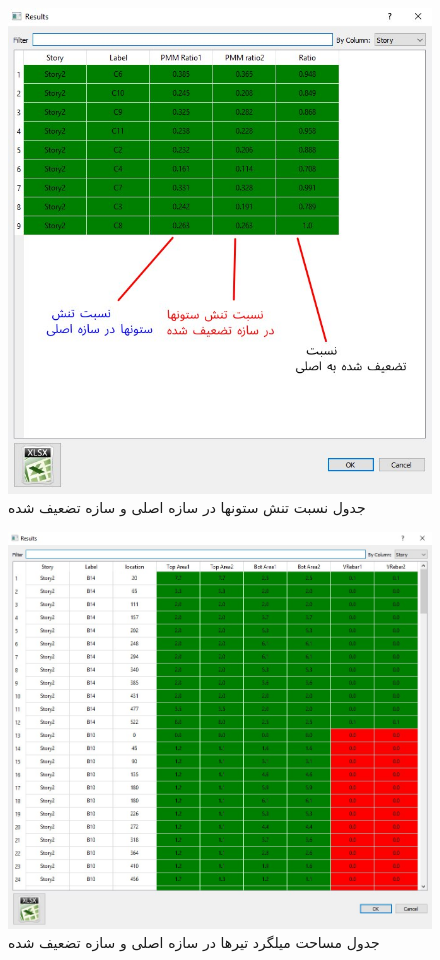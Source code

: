 \begin{figure}
    \centering
    \includegraphics[scale=.7]{figures/weakness_column}
    \caption{جدول نسبت تنش ستونها در سازه اصلی و سازه تضعیف شده}
    \label{pic:weakness_column}
\end{figure}

\begin{figure}
    \centering
    \includegraphics[scale=.6]{figures/weakness_beam}
    \caption{جدول مساحت میلگرد تیرها در سازه اصلی و سازه تضعیف شده}
    \label{pic:weakness_beam}
\end{figure}